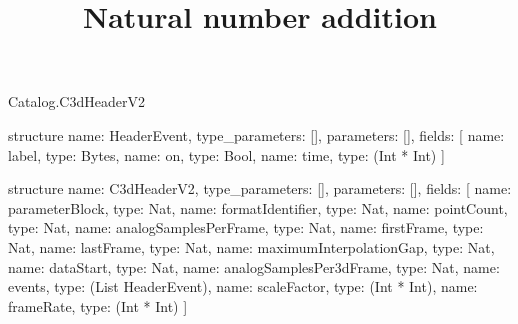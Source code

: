 \begin{lexlean}{Catalog.C3dHeaderV2}
\title{Natural number addition}
\begin{semanticmodule}
structure{
  name: HeaderEvent,
  type_parameters: [],
  parameters: [],
  fields: [
    {name: label, type: Bytes},
    {name: on, type: Bool},
    {name: time, type: (Int * Int)}
  ]
}

structure{
  name: C3dHeaderV2,
  type_parameters: [],
  parameters: [],
  fields: [
    {name: parameterBlock, type: Nat},
    {name: formatIdentifier, type: Nat},
    {name: pointCount, type: Nat},
    {name: analogSamplesPerFrame, type: Nat},
    {name: firstFrame, type: Nat},
    {name: lastFrame, type: Nat},
    {name: maximumInterpolationGap, type: Nat},
    {name: dataStart, type: Nat},
    {name: analogSamplesPer3dFrame, type: Nat},
    {name: events, type: (List HeaderEvent)},
    {name: scaleFactor, type: (Int * Int)},
    {name: frameRate, type: (Int * Int)}
  ]
}
\end{semanticmodule}
\end{lexlean}
